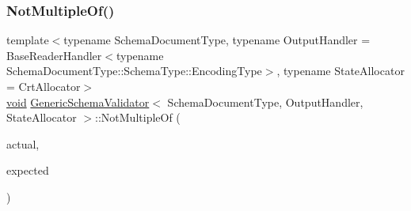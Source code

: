 \mbox{\label{classGenericSchemaValidator_ab2f08413a2b23d73d4bbd09c8ca1f547}} 
\subsubsection{\texorpdfstring{Not\+Multiple\+Of()}{NotMultipleOf()}\hspace{0.1cm}{\footnotesize\ttfamily [1/3]}}
{\footnotesize\ttfamily template$<$typename Schema\+Document\+Type, typename Output\+Handler = Base\+Reader\+Handler$<$typename Schema\+Document\+Type\+::\+Schema\+Type\+::\+Encoding\+Type$>$, typename State\+Allocator = Crt\+Allocator$>$ \\
\hyperlink{imgui__impl__opengl3__loader_8h_ac668e7cffd9e2e9cfee428b9b2f34fa7}{void} \hyperlink{classGenericSchemaValidator}{Generic\+Schema\+Validator}$<$ Schema\+Document\+Type, Output\+Handler, State\+Allocator $>$\+::Not\+Multiple\+Of (\begin{DoxyParamCaption}\item[{\hyperlink{stdint_8h_a414156feea104f8f75b4ed9e3121b2f6}{int64\+\_\+t}}]{actual,  }\item[{const \hyperlink{classGenericSchemaValidator_a3c004e35c7eb9fa5a28c0ccfb8ac62dc}{S\+Value} \&}]{expected }\end{DoxyParamCaption})\hspace{0.3cm}{\ttfamily [inline]}}

\mbox{\label{classGenericSchemaValidator_a5c59d25dc44d85404cc587ebfa7455cd}} 
